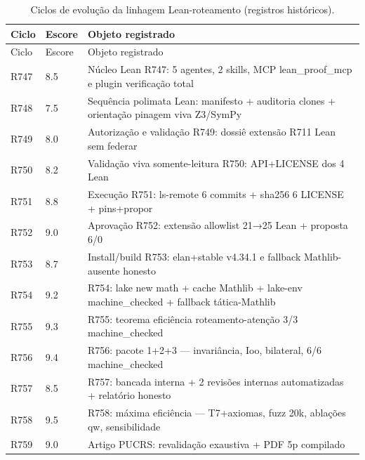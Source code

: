 \begin{longtable}{p{1.1cm}p{1.2cm}p{12.2cm}}
\caption{Ciclos de evolução da linhagem Lean-roteamento (registros históricos).}\label{tab:historico}\\
\toprule
Ciclo & Escore & Objeto registrado \\
\midrule
\endfirsthead
\toprule
Ciclo & Escore & Objeto registrado \\
\midrule
\endhead
R747 & 8.5 & \parbox[t]{12cm}{\raggedright\footnotesize Núcleo Lean R747: 5 agentes, 2 skills, MCP lean\_proof\_mcp e plugin verificação total} \\
R748 & 7.5 & \parbox[t]{12cm}{\raggedright\footnotesize Sequência polimata Lean: manifesto + auditoria clones + orientação pinagem viva Z3/SymPy} \\
R749 & 8.0 & \parbox[t]{12cm}{\raggedright\footnotesize Autorização e validação R749: dossiê extensão R711 Lean sem federar} \\
R750 & 8.2 & \parbox[t]{12cm}{\raggedright\footnotesize Validação viva somente-leitura R750: API+LICENSE dos 4 Lean} \\
R751 & 8.8 & \parbox[t]{12cm}{\raggedright\footnotesize Execução R751: ls-remote 6 commits + sha256 6 LICENSE + pins+propor} \\
R752 & 9.0 & \parbox[t]{12cm}{\raggedright\footnotesize Aprovação R752: extensão allowlist 21→25 Lean + proposta 6/0} \\
R753 & 8.7 & \parbox[t]{12cm}{\raggedright\footnotesize Install/build R753: elan+stable v4.34.1 e fallback Mathlib-ausente honesto} \\
R754 & 9.2 & \parbox[t]{12cm}{\raggedright\footnotesize R754: lake new math + cache Mathlib + lake-env machine\_checked + fallback tática-Mathlib} \\
R755 & 9.3 & \parbox[t]{12cm}{\raggedright\footnotesize R755: teorema eficiência roteamento-atenção 3/3 machine\_checked} \\
R756 & 9.4 & \parbox[t]{12cm}{\raggedright\footnotesize R756: pacote 1+2+3 — invariância, Ioo, bilateral, 6/6 machine\_checked} \\
R757 & 8.5 & \parbox[t]{12cm}{\raggedright\footnotesize R757: bancada interna + 2 revisões internas automatizadas + relatório honesto} \\
R758 & 9.5 & \parbox[t]{12cm}{\raggedright\footnotesize R758: máxima eficiência — T7+axiomas, fuzz 20k, ablações qw, sensibilidade} \\
R759 & 9.0 & \parbox[t]{12cm}{\raggedright\footnotesize Artigo PUCRS: revalidação exaustiva + PDF 5p compilado} \\

\end{longtable}
